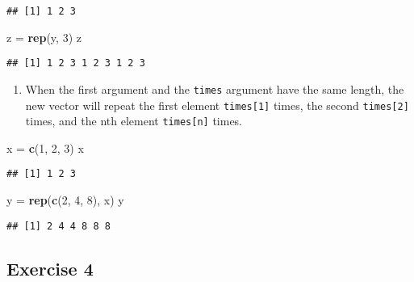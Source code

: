 \documentclass[
]{article}
\newenvironment{Shaded}{\begin{snugshade}}{\end{snugshade}}
\newcommand{\DecValTok}[1]{\textcolor[rgb]{0.00,0.00,0.81}{#1}}
\newcommand{\KeywordTok}[1]{\textcolor[rgb]{0.13,0.29,0.53}{\textbf{#1}}}
\newcommand{\NormalTok}[1]{#1}
\newcommand{\StringTok}[1]{\textcolor[rgb]{0.31,0.60,0.02}{#1}}
\providecommand{\tightlist}{%
  \setlength{\itemsep}{0pt}\setlength{\parskip}{0pt}}
\begin{document}
\begin{verbatim}
## [1] 1 2 3
\end{verbatim}

\begin{Shaded}
\begin{Highlighting}[]
\NormalTok{z =}\StringTok{ }\KeywordTok{rep}\NormalTok{(y, }\DecValTok{3}\NormalTok{)}
\NormalTok{z}
\end{Highlighting}
\end{Shaded}

\begin{verbatim}
## [1] 1 2 3 1 2 3 1 2 3
\end{verbatim}

\begin{enumerate}
\def\labelenumi{\arabic{enumi}.}
\setcounter{enumi}{2}
\tightlist
\item
  When the first argument and the \texttt{times} argument have the same
  length, the new vector will repeat the first element
  \texttt{times{[}1{]}} times, the second \texttt{times{[}2{]}} times,
  and the nth element \texttt{times{[}n{]}} times.
\end{enumerate}

\begin{Shaded}
\begin{Highlighting}[]
\NormalTok{x =}\StringTok{ }\KeywordTok{c}\NormalTok{(}\DecValTok{1}\NormalTok{, }\DecValTok{2}\NormalTok{, }\DecValTok{3}\NormalTok{)}
\NormalTok{x}
\end{Highlighting}
\end{Shaded}

\begin{verbatim}
## [1] 1 2 3
\end{verbatim}

\begin{Shaded}
\begin{Highlighting}[]
\NormalTok{y =}\StringTok{ }\KeywordTok{rep}\NormalTok{(}\KeywordTok{c}\NormalTok{(}\DecValTok{2}\NormalTok{, }\DecValTok{4}\NormalTok{, }\DecValTok{8}\NormalTok{), x)}
\NormalTok{y}
\end{Highlighting}
\end{Shaded}

\begin{verbatim}
## [1] 2 4 4 8 8 8
\end{verbatim}

\hypertarget{exercise-4}{%
\subsection{Exercise 4}\label{exercise-4}}
\end{document}
